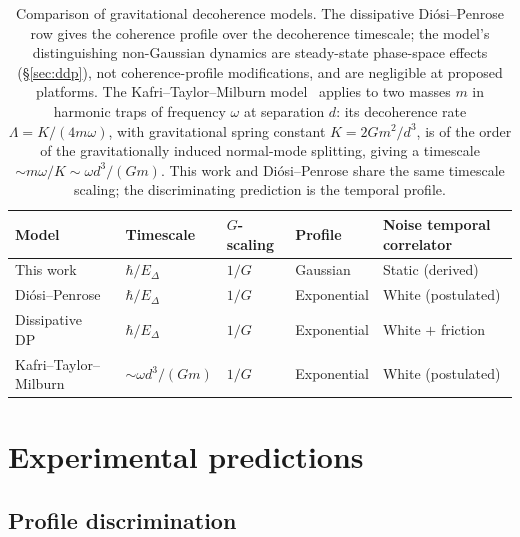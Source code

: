 \documentclass[12pt,a4paper]{article}
\theoremstyle{remark}
\begin{document}
\begin{table}[h]
\centering
\begin{tabular}{lllll}
\toprule
Model & Timescale & $G$-scaling & Profile & Noise temporal correlator \\
\midrule
This work & $\hbar/E_\Delta$ & $1/G$ & Gaussian & Static (derived) \\
Di\'osi--Penrose & $\hbar/E_\Delta$ & $1/G$ & Exponential & White (postulated) \\
Dissipative DP~\cite{ddp_model} & $\hbar/E_\Delta$ & $1/G$ & Exponential & White $+$ friction \\
Kafri--Taylor--Milburn & $\sim \omega d^3/(G m)$ & $1/G$ & Exponential & White (postulated) \\
\bottomrule
\end{tabular}
\caption{Comparison of gravitational decoherence models. The dissipative Di\'osi--Penrose
row gives the coherence profile over the decoherence timescale; the model's distinguishing
non-Gaussian dynamics are steady-state phase-space effects (\S\ref{sec:ddp}), not
coherence-profile modifications, and are negligible at proposed platforms. The
Kafri--Taylor--Milburn
model~\cite{kafri} applies to two masses $m$ in harmonic traps of frequency $\omega$ at
separation $d$: its decoherence rate $\Lambda = K/(4m\omega)$, with gravitational spring
constant $K = 2Gm^2/d^3$, is of the order of the gravitationally induced normal-mode
splitting, giving a timescale $\sim m\omega/K \sim \omega d^3/(Gm)$. This work and
Di\'osi--Penrose share the same timescale scaling; the discriminating prediction is the
temporal profile.}
\label{tab:models}
\end{table}

\section{Experimental predictions}
\label{sec:predictions}

\subsection{Profile discrimination}
\end{document}
